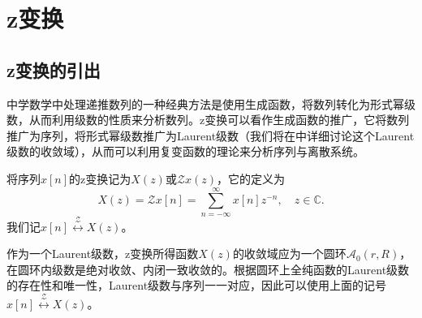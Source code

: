 \section{z变换}\label{sec:z_Transform}

\subsection{z变换的引出}\label{sub:inteoduction_of_z}
中学数学中处理递推数列的一种经典方法是使用生成函数，将数列转化为形式幂级数，从而利用级数的性质来分析数列。z变换可以看作生成函数的推广，它将数列推广为序列，将形式幂级数推广为Laurent级数（我们将在中详细讨论这个Laurent级数的收敛域），从而可以利用复变函数的理论来分析序列与离散系统。
\begin{definition}[z变换]\label{def:z}
    将序列$x[n]$的z变换记为$X(z)$或$\mathcal{Z}x(z)$，它的定义为
    \begin{equation}
        X(z)=\mathcal{Z}x[n]=\sum_{n=-\infty}^{\infty}x[n]z^{-n},\quad z\in\mathbb{C}.
    \end{equation}
    我们记$x[n]\overset{\mathcal{Z}}{\longleftrightarrow}X(z)$。
\end{definition}
作为一个Laurent级数，z变换所得函数$X(z)$的收敛域应为一个圆环$\mathcal{A}_0(r,R)$，在圆环内级数是绝对收敛、内闭一致收敛的。根据圆环上全纯函数的Laurent级数的存在性和唯一性，Laurent级数与序列一一对应，因此可以使用上面的记号$x[n]\overset{\mathcal{Z}}{\longleftrightarrow}X(z)$。

